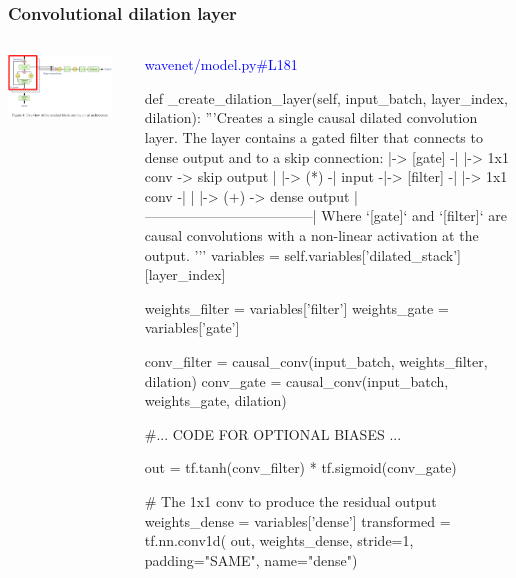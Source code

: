 \documentclass[8pt]{beamer}
\begin{document}
\begin{frame}[fragile]
\frametitle{Convolutional dilation layer}
\begin{columns}
\begin{column}{0.5\textwidth}
 
\includegraphics[width=0.9\textwidth]{./dl3_images/dilation_layer.png}

\end{column}
\begin{column}{0.5\textwidth}
 \textcolor{blue}{wavenet/model.py\#L181}
 
 \begin{verbnobox}[\tiny]
def _create_dilation_layer(self, input_batch, layer_index, dilation):
        '''Creates a single causal dilated convolution layer.
        The layer contains a gated filter that connects to dense output
        and to a skip connection:
               |-> [gate]   -|        |-> 1x1 conv -> skip output
               |             |-> (*) -|
        input -|-> [filter] -|        |-> 1x1 conv -|
               |                                    |-> (+) -> dense output
               |------------------------------------|
        Where `[gate]` and `[filter]` are causal convolutions with a
        non-linear activation at the output.
        '''
        variables = self.variables['dilated_stack'][layer_index]

        weights_filter = variables['filter']
        weights_gate = variables['gate']

        conv_filter = causal_conv(input_batch, weights_filter, dilation)
        conv_gate = causal_conv(input_batch, weights_gate, dilation)

            #... CODE FOR OPTIONAL BIASES ...

        out = tf.tanh(conv_filter) * tf.sigmoid(conv_gate)

        # The 1x1 conv to produce the residual output
        weights_dense = variables['dense']
        transformed = tf.nn.conv1d(
            out, weights_dense, stride=1, padding="SAME", name="dense")


\end{verbnobox}
\end{column}
\end{columns}
\end{frame}
\end{document}
